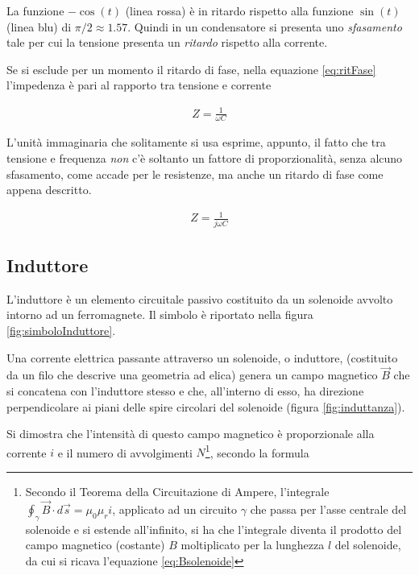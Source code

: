 \documentclass[17pt]{extarticle}
\begin{document}
\begin{enumerate}
La funzione $-\cos(t)$ (linea rossa) è in ritardo rispetto alla funzione $\sin(t)$ (linea blu) di $\pi/2 \approx 1.57$. Quindi in un condensatore si presenta uno \emph{sfasamento} tale per cui la tensione presenta un \emph{ritardo} rispetto alla corrente. 

Se si esclude per un momento il ritardo di fase, nella equazione \ref{eq:ritFase} l'impedenza è pari al rapporto tra tensione e corrente


\begin{eqnarray}
	Z = \frac{1}{\omega C}
\end{eqnarray}

L'unità immaginaria che solitamente si usa esprime, appunto, il fatto che tra tensione e frequenza \emph{non} c'è soltanto un fattore di proporzionalità, senza alcuno sfasamento, come accade per le resistenze, ma anche un ritardo di fase come appena descritto.


\begin{eqnarray}
	Z = \frac{1}{j\omega C}
\end{eqnarray}



\subsection{Induttore}

L'induttore è un elemento circuitale passivo costituito da un solenoide avvolto intorno ad un ferromagnete. Il simbolo è riportato nella figura \ref{fig:simboloInduttore}. 

Una corrente elettrica passante attraverso un solenoide, o induttore, (costituito da un filo che descrive una geometria ad elica) genera un campo magnetico $\vec{B}$ che si concatena con l'induttore stesso e che, all'interno di esso, ha direzione perpendicolare ai piani delle spire circolari del solenoide (figura \ref{fig:induttanza}). 

Si dimostra che l'intensità di questo campo magnetico è proporzionale alla corrente $i$ e il numero di avvolgimenti $N$\footnote{Secondo il Teorema della Circuitazione di Ampere, l'integrale $\oint_{\gamma}\vec{B}\cdot d\vec{s} = \mu_0\mu_r i$, applicato ad un circuito $\gamma$ che passa per l'asse centrale del solenoide e si estende all'infinito, si ha che l'integrale diventa il prodotto del campo magnetico (costante) $B$ moltiplicato per la lunghezza $l$ del solenoide, da cui si ricava l'equazione \ref{eq:Bsolenoide} }, secondo la formula




\end{enumerate}
\end{document}
